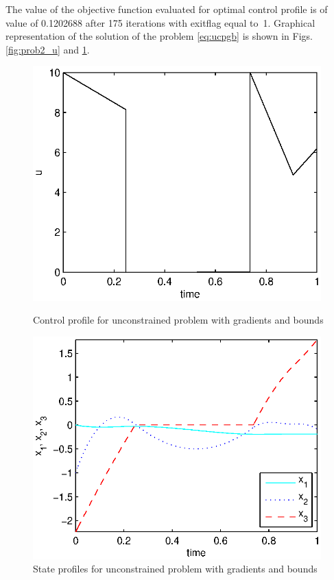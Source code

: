The value of the objective function evaluated for optimal control
profile is of value of 0.1202688 after 175 iterations with exitflag
equal to~1. Graphical representation of the solution of the problem
\eqref{eq:ucpgb} is shown in Figs. \ref{fig:prob2_u} and
\ref{fig:prob2_x}.

\begin{figure}[htb]
\begin{minipage}[t]{0.5\linewidth}
\centering
\includegraphics[width=0.99\textwidth]{examples/problem2/graphs/u_624a.eps}
\caption[Tutorial example 3: control profile]{Control profile for
  unconstrained problem with gradients and bounds} \label{fig:prob2_u} 
\end{minipage}
\begin{minipage}[t]{0.5\linewidth}
\centering
\includegraphics[width=0.99\textwidth]{examples/problem2/graphs/x13_624a.eps}
\caption[Tutorial example 3: state profiles]{State profiles for
  unconstrained problem with gradients and bounds} \label{fig:prob2_x}
\end{minipage}
\end{figure}

